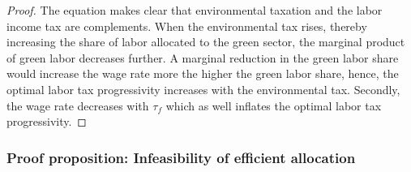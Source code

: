 \begin{proof}
The equation makes clear that environmental taxation and the labor income tax are complements. When the environmental tax rises, thereby increasing the share of labor allocated to the green sector, the marginal product of green labor decreases further. A marginal reduction in the green labor share would increase the wage rate more the higher the green labor share, hence, the optimal labor tax progressivity increases with the environmental tax. 
Secondly, the wage rate decreases with $\tau_f$ which as well inflates the optimal labor tax progressivity. 
	\end{proof}

\subsubsection{Proof proposition: Infeasibility of efficient allocation}
